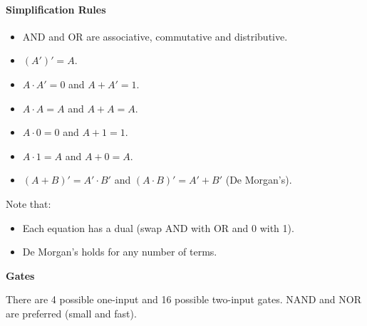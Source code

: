 \documentclass[twocolumn,english]{article}
\begin{document}
\paragraph{Simplification Rules}
\begin{itemize}
\item AND and OR are associative, commutative and distributive.
\item $\left(A'\right)'=A$.
\item $A\cdot A'=0$ and $A+A'=1$.
\item $A\cdot A=A$ and $A+A=A$.
\item $A\cdot0=0$ and $A+1=1$.
\item $A\cdot1=A$ and $A+0=A$.
\item $\left(A+B\right)'=A'\cdot B'$ and $\left(A\cdot B\right)'=A'+B'$
(De Morgan's).
\end{itemize}
Note that:
\begin{itemize}
\item Each equation has a dual (swap AND with OR and 0 with 1).
\item De Morgan's holds for any number of terms.
\end{itemize}
\textbf{Gates}

There are 4 possible one-input and 16 possible two-input gates. NAND
and NOR are preferred (small and fast).

\begin{figure}[H]
\noindent \begin{centering}
\par\end{centering}

\bigskip{}


\noindent \begin{centering}
\par\end{centering}

\bigskip{}


\noindent \centering{}
\end{figure}
\end{document}
